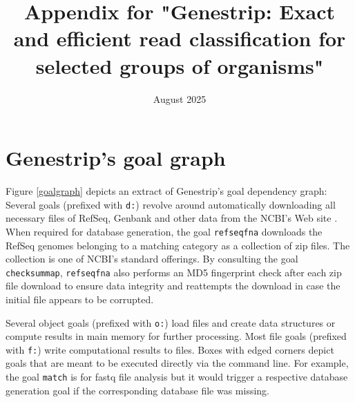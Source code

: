 \documentclass[pdflatex,sn-vancouver-num]{sn-jnl}
\begin{document}
    \title{Appendix for "Genestrip: Exact and efficient read classification for selected groups of organisms"}

    \author*[1]{ }
   
	\author[1]{ }

    \author[2]{ }

    

    \date{August 2025}


    \maketitle
    
\section{Genestrip's goal graph}
\label{ggg}

    Figure \ref{goalgraph} depicts an extract of Genestrip's goal dependency graph: Several goals (prefixed with \verb|d:|) revolve around automatically downloading all necessary files of RefSeq, Genbank and other data from the NCBI's Web site \citep{Sayers:2025aa}.
    When required for database generation, the goal \verb|refseqfna| downloads the RefSeq genomes belonging to a matching category as a collection of zip files. The collection is one of NCBI's  standard offerings. By consulting the goal \verb|checksummap|, \verb|refseqfna| also performs an MD5 fingerprint check after each zip file download to ensure data integrity and reattempts the download in case the initial file appears to be corrupted.

    Several object goals (prefixed with \verb|o:|) load files and create data structures or compute results in main memory for further processing. Most file goals (prefixed with \verb|f:|) write computational results to files.
    Boxes with edged corners depict goals that are meant to be executed directly via the command line. For example,
    the goal \verb|match| is for fastq file analysis but it would trigger a respective database generation goal if the corresponding database file was missing.
\end{document}
